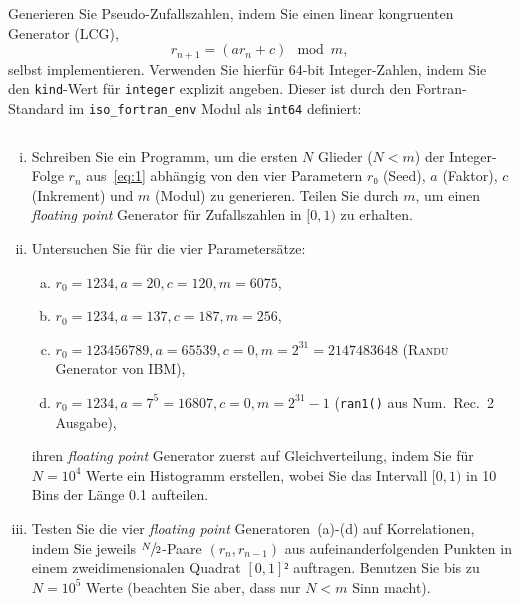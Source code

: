 
\NewDocumentCommand{}
\date{Ausgabe: Di, 16.04.2019, Besprechung: Fr, 26.04.2019}
\setcounter{question}{3}


\maketitle

\begin{question}[subtitle=Linear kongruente Generatoren]
  Generieren Sie Pseudo-Zufallszahlen, indem Sie einen linear kongruenten Generator (LCG),
  \begin{equation}
    \label{eq:1}
    r_{n + 1} = \left( a r_n + c \right) \mod m,
  \end{equation}
  selbst implementieren.
  Verwenden Sie hierfür \num{64}-bit Integer-Zahlen, indem Sie den \texttt{kind}-Wert für \texttt{integer} explizit angeben.
  Dieser ist durch den Fortran-Standard im \texttt{iso\_fortran\_env} Modul als \texttt{int64} definiert:
  \inputminted{fortran}{../src/aufgabe03.f90}
  \begin{enumerate}[(i)]
  \item Schreiben Sie ein Programm, um die ersten $N$ Glieder ($N < m$) der Integer-Folge $r_n$ aus~\cref{eq:1} abhängig von den vier Parametern $r₀$ (Seed), $a$ (Faktor), $c$ (Inkrement) und $m$ (Modul) zu generieren.
    Teilen Sie durch $m$, um einen \textit{floating point} Generator für Zufallszahlen in $[0, 1)$ zu erhalten.
  \item Untersuchen Sie für die vier Parametersätze:
    \begin{enumerate}[(a)]
    \item\label{item:1} $r_0 = 1234, a = 20, c = 120, m = 6075$,
    \item\label{item:2} $r_0 = 1234, a = 137, c = 187, m = 256$,
    \item\label{item:3} $r_0 = 123456789, a = 65539, c = 0, m = 2^{31} = 2147483648$ (\textsc{Randu} Generator von IBM),
    \item\label{item:4} $r_0 = 1234, a = 7^5 = 16807, c = 0, m = 2^{31} - 1$ (\texttt{ran1()} aus Num.\ Rec.\ 2 Ausgabe),
    \end{enumerate}
    ihren \textit{floating point} Generator zuerst auf Gleichverteilung, indem Sie für $N = 10^4$ Werte ein Histogramm erstellen, wobei Sie das Intervall $[0, 1)$ in \num{10} Bins der Länge \num{0.1} aufteilen.
  \item Testen Sie die vier \textit{floating point} Generatoren~(a)-(d) auf Korrelationen, indem Sie jeweils $\sfrac{N}{2}$-Paare $(r_n, r_{n - 1})$ aus aufeinanderfolgenden Punkten in einem zweidimensionalen Quadrat $[0, 1]²$ auftragen.
    Benutzen Sie bis zu $N = 10^5$ Werte (beachten Sie aber, dass nur $N < m$ Sinn macht).
  \end{enumerate}
\end{question}

